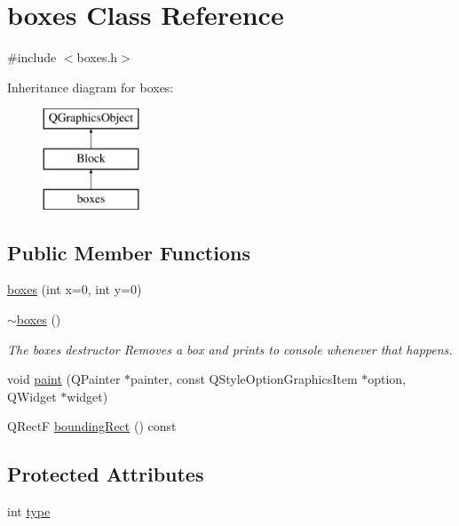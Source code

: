 \hypertarget{classboxes}{\section{boxes Class Reference}
\label{classboxes}
}


{\ttfamily \#include $<$boxes.\-h$>$}

Inheritance diagram for boxes\-:\begin{figure}[H]
\begin{center}
\leavevmode
\includegraphics[height=3.000000cm]{classboxes}
\end{center}
\end{figure}
\subsection*{Public Member Functions}
\begin{DoxyCompactItemize}
\item 
\hyperlink{classboxes_a093427b27f4b84a803544cb738dc12e6}{boxes} (int x=0, int y=0)
\item 
\hyperlink{classboxes_a7d70921b4fe775ad313ac80d6da55222}{$\sim$boxes} ()
\begin{DoxyCompactList}\small\item\em The boxes destructor Removes a box and prints to console whenever that happens. \end{DoxyCompactList}\item 
void \hyperlink{classboxes_aa07b0460f8be5da676c4369331061fa6}{paint} (Q\-Painter $\ast$painter, const Q\-Style\-Option\-Graphics\-Item $\ast$option, Q\-Widget $\ast$widget)
\item 
Q\-Rect\-F \hyperlink{classboxes_a4855400f92db9ebe776a79c79bac1d50}{bounding\-Rect} () const 
\end{DoxyCompactItemize}
\subsection*{Protected Attributes}
\begin{DoxyCompactItemize}
\item 
int \hyperlink{classboxes_a2600eb866b188f33fb6415fc358f449a}{type}
\end{DoxyCompactItemize}


